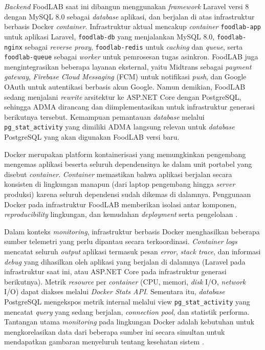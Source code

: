 \textit{Backend} FoodLAB saat ini dibangun menggunakan \textit{framework} Laravel versi 8 dengan MySQL 8.0 sebagai \textit{database} aplikasi, dan berjalan di atas infrastruktur berbasis Docker \textit{container}. Infrastruktur aktual mencakup \textit{container} \texttt{foodlab-app} untuk aplikasi Laravel, \texttt{foodlab-db} yang menjalankan MySQL 8.0, \texttt{foodlab-nginx} sebagai \textit{reverse proxy}, \texttt{foodlab-redis} untuk \textit{caching} dan \textit{queue}, serta \texttt{foodlab-queue} sebagai \textit{worker} untuk pemrosesan tugas asinkron. FoodLAB juga mengintegrasikan beberapa layanan eksternal, yaitu Midtrans sebagai \textit{payment gateway}, \textit{Firebase Cloud Messaging} (FCM) untuk notifikasi \textit{push}, dan Google OAuth untuk autentikasi berbasis akun Google. Namun demikian, FoodLAB sedang menjalani \textit{rewrite} arsitektur ke ASP.NET Core dengan PostgreSQL, sehingga ADMA dirancang dan diimplementasikan untuk infrastruktur generasi berikutnya tersebut. Kemampuan pemantauan \textit{database} melalui \texttt{pg\_stat\_activity} yang dimiliki ADMA langsung relevan untuk \textit{database} PostgreSQL yang akan digunakan FoodLAB versi baru.

Docker merupakan platform kontainerisasi yang memungkinkan pengembang mengemas aplikasi beserta seluruh dependensinya ke dalam unit portabel yang disebut \textit{container}. \textit{Container} memastikan bahwa aplikasi berjalan secara konsisten di lingkungan manapun (dari laptop pengembang hingga \textit{server} produksi) karena seluruh dependensi sudah dikemas di dalamnya. Penggunaan Docker pada infrastruktur FoodLAB memberikan isolasi antar komponen, \textit{reproducibility} lingkungan, dan kemudahan \textit{deployment} serta pengelolaan \cite{zou2022docker}.

Dalam konteks \textit{monitoring}, infrastruktur berbasis Docker menghasilkan beberapa sumber telemetri yang perlu dipantau secara terkoordinasi. \textit{Container logs} mencatat seluruh \textit{output} aplikasi termasuk pesan \textit{error}, \textit{stack trace}, dan informasi \textit{debug} yang dihasilkan oleh aplikasi yang berjalan di dalamnya (Laravel pada infrastruktur saat ini, atau ASP.NET Core pada infrastruktur generasi berikutnya). Metrik \textit{resource} per \textit{container} (CPU, memori, \textit{disk} I/O, \textit{network} I/O) dapat diakses melalui \textit{Docker Stats API}. Sementara itu, \textit{database} PostgreSQL mengekspos metrik internal melalui view \texttt{pg\_stat\_activity} yang mencatat \textit{query} yang sedang berjalan, \textit{connection pool}, dan statistik performa. Tantangan utama \textit{monitoring} pada lingkungan Docker adalah kebutuhan untuk mengkorelasikan data dari beberapa sumber ini secara simultan untuk mendapatkan gambaran menyeluruh tentang kesehatan sistem \cite{trinity2023, hrusto2025monitoring, faseeha2025observability}.

